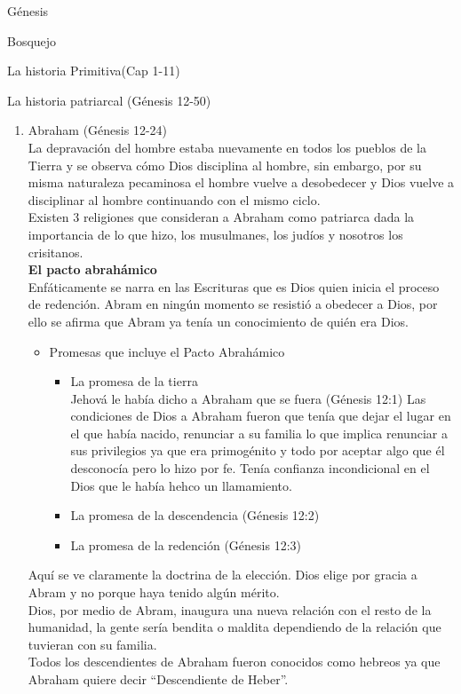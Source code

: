 \begin{section}{Génesis}
\begin{subsection}{Bosquejo}
\begin{subsubsection}{La historia Primitiva(Cap 1-11)}
		\end{subsubsection}
		\begin{subsubsection}{La historia patriarcal (Génesis 12-50)}
			\begin{enumerate}
				\item Abraham (Génesis 12-24)\\
					La depravación del hombre estaba nuevamente en todos los pueblos de la Tierra y se observa cómo Dios disciplina al hombre, sin embargo, por su misma naturaleza pecaminosa el hombre vuelve a desobedecer y Dios vuelve a disciplinar al hombre continuando con el mismo ciclo.\\
Existen 3 religiones que consideran a Abraham como patriarca dada la importancia de lo que hizo, los musulmanes, los judíos y nosotros los crisitanos.\\
	\textbf{El pacto abrahámico}\\
					Enfáticamente se narra en las Escrituras que es Dios quien inicia el proceso de redención. Abram en ningún momento se resistió a obedecer a Dios, por ello se afirma que Abram ya tenía un conocimiento de quién era Dios.
					\begin{itemize}
						\item Promesas que incluye el Pacto Abrahámico
							\begin{itemize}
							\item La promesa de la tierra\\
							Jehová le había dicho a Abraham que se fuera (Génesis 12:1)\newpage
							Las condiciones de Dios a Abraham fueron que tenía que dejar el lugar en el que había nacido, renunciar a su familia lo que implica renunciar a sus privilegios ya que era primogénito y todo por aceptar algo que él desconocía pero lo hizo por fe. Tenía confianza incondicional en el Dios que le había hehco un llamamiento.
					\item La promesa de la descendencia (Génesis 12:2)
				\item La promesa de la redención (Génesis 12:3)
			\end{itemize}
	\end{itemize}
				Aquí se ve claramente la doctrina de la elección. Dios elige por gracia a Abram y no porque haya tenido algún mérito.\\
							Dios, por medio de Abram, inaugura una nueva relación con el resto de la humanidad, la gente sería bendita o maldita dependiendo de la relación que tuvieran con su familia.\\
							Todos los descendientes de Abraham fueron conocidos como hebreos ya que Abraham quiere decir ``Descendiente de Heber''.\\

\end{enumerate}
\end{subsubsection}
\end{subsection}
\end{section}
